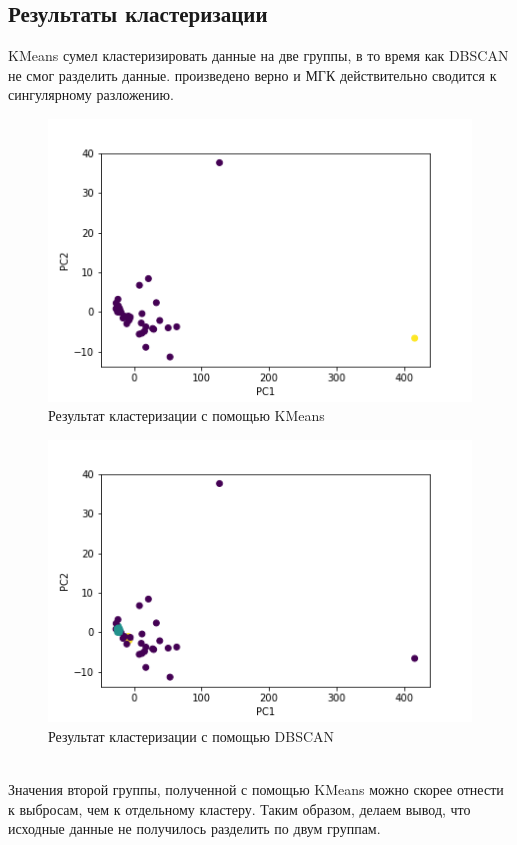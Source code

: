 \documentclass[a4]{article}
\begin{document}
	\subsection{Результаты кластеризации}
	KMeans сумел кластеризировать данные на две группы, в то время как DBSCAN не смог разделить данные.
	произведено верно и МГК действительно сводится к сингулярному разложению.
	\begin{figure}[h!]
		\includegraphics[width=\textwidth]{kmeans_cutoff.png}\caption[Результат кластеризации с помощью KMeans]{Результат кластеризации с помощью KMeans}
	\end{figure}
	\begin{figure}[h!]
		\includegraphics[width=\textwidth]{dbscan_cutoff.png}\caption[Результат кластеризации с помощью DBSCAN]{Результат кластеризации с помощью DBSCAN}
	\end{figure} \\
	Значения второй группы, полученной с помощью KMeans можно скорее отнести к выбросам, чем к отдельному кластеру. Таким образом, делаем вывод, что исходные данные не получилось разделить по двум группам.
	
\end{document}
